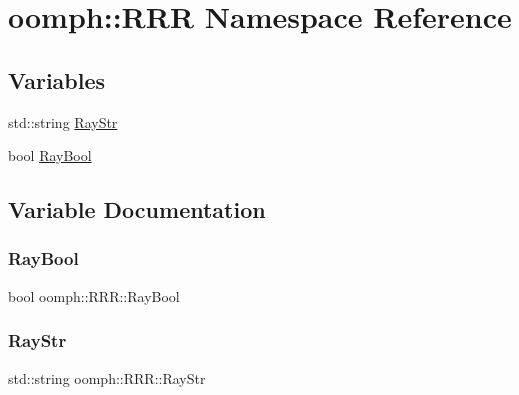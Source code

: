 \hypertarget{namespaceoomph_1_1RRR}{}\section{oomph\+:\+:R\+RR Namespace Reference}
\label{namespaceoomph_1_1RRR}
\subsection*{Variables}
\begin{DoxyCompactItemize}
\item 
std\+::string \hyperlink{namespaceoomph_1_1RRR_aeb3f04d09ecf50524c3a913b35a10f82}{Ray\+Str}
\item 
bool \hyperlink{namespaceoomph_1_1RRR_ae792a9ead71fdc3c728f5cf843c257d3}{Ray\+Bool}
\end{DoxyCompactItemize}


\subsection{Variable Documentation}
\mbox{\label{namespaceoomph_1_1RRR_ae792a9ead71fdc3c728f5cf843c257d3}} 
\subsubsection{\texorpdfstring{Ray\+Bool}{RayBool}}
{\footnotesize\ttfamily bool oomph\+::\+R\+R\+R\+::\+Ray\+Bool}

\mbox{\label{namespaceoomph_1_1RRR_aeb3f04d09ecf50524c3a913b35a10f82}} 
\subsubsection{\texorpdfstring{Ray\+Str}{RayStr}}
{\footnotesize\ttfamily std\+::string oomph\+::\+R\+R\+R\+::\+Ray\+Str}

